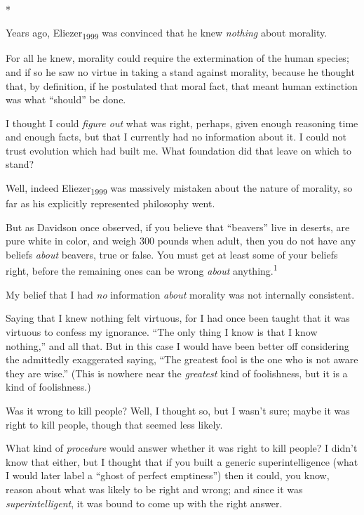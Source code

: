 {\centering
 \ ~
\par}

{\centering
 *
\par}


{
 Years ago, Eliezer\textsubscript{1999} was convinced that he knew
\textit{nothing} about morality. }

{
 For all he knew, morality could require the extermination of the
human species; and if so he saw no virtue in taking a stand against
morality, because he thought that, by definition, if he postulated that
moral fact, that meant human extinction was what
``should'' be done.}

{
 I thought I could \textit{figure out} what was right, perhaps,
given enough reasoning time and enough facts, but that I currently had
no information about it. I could not trust evolution which had built
me. What foundation did that leave on which to stand?}

{
 Well, indeed Eliezer\textsubscript{1999} was massively mistaken
about the nature of morality, so far as his explicitly represented
philosophy went.}

{
 But as Davidson once observed, if you believe that
``beavers'' live in deserts, are
pure white in color, and weigh 300 pounds when adult, then you do not
have any beliefs \textit{about} beavers, true or false. You must get at
least some of your beliefs right, before the remaining ones can be
wrong \textit{about} anything.\textsuperscript{1}}

{
 My belief that I had \textit{no} information \textit{about}
morality was not internally consistent.}

{
 Saying that I knew nothing felt virtuous, for I had once been
taught that it was virtuous to confess my ignorance.
``The only thing I know is that I know
nothing,'' and all that. But in this case I would
have been better off considering the admittedly exaggerated saying,
``The greatest fool is the one who is not aware they
are wise.'' (This is nowhere near the
\textit{greatest} kind of foolishness, but it is a kind of
foolishness.)}

{
 Was it wrong to kill people? Well, I thought so, but I
wasn't sure; maybe it was right to kill people, though
that seemed less likely.}

{
 What kind of \textit{procedure} would answer whether it was right
to kill people? I didn't know that either, but I
thought that if you built a generic superintelligence (what I would
later label a ``ghost of perfect
emptiness'') then it could, you know, reason about
what was likely to be right and wrong; and since it was
\textit{superintelligent}, it was bound to come up with the right
answer.}

